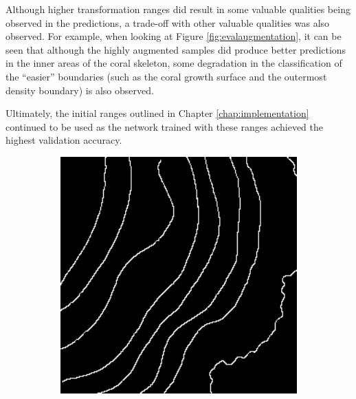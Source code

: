 Although higher transformation ranges did result in some valuable qualities being observed in the predictions, a trade-off with other valuable qualities was also observed. For example, when looking at Figure \ref{fig:evalaugmentation}, it can be seen that although the highly augmented samples did produce better predictions in the inner areas of the coral skeleton, some degradation in the classification of the ``easier'' boundaries (such as the coral growth surface and the outermost density boundary) is also observed.

Ultimately, the initial ranges outlined in Chapter \ref{chap:implementation} continued to be used as the network trained with these ranges achieved the highest validation accuracy.

\begin{figure}[!t]
    \centering
    \begin{subfigure}[t]{0.24\textwidth}
        \centering
        \includegraphics[width=1\textwidth, valign=c]{images/lr-comparison.png}
        \caption{}
    \end{subfigure}
    \begin{subfigure}[t]{0.24\textwidth}
        \centering

\end{subfigure}
\end{figure}
